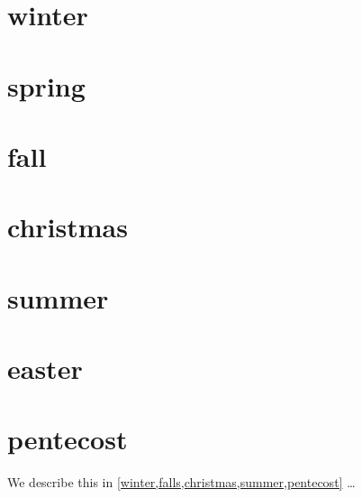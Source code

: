 \documentclass{article}
\begin{document}
\section{winter}\label{winter}

\section{spring}\label{spring}

\section{fall}\label{falls}

\section{christmas}\label{christmas}
\section{summer}\label{summer}
\section{easter}\label{easter}

\section{pentecost}\label{pentecost}

We describe this in \cref{winter,falls,christmas,summer,pentecost} \dots
\end{document}
